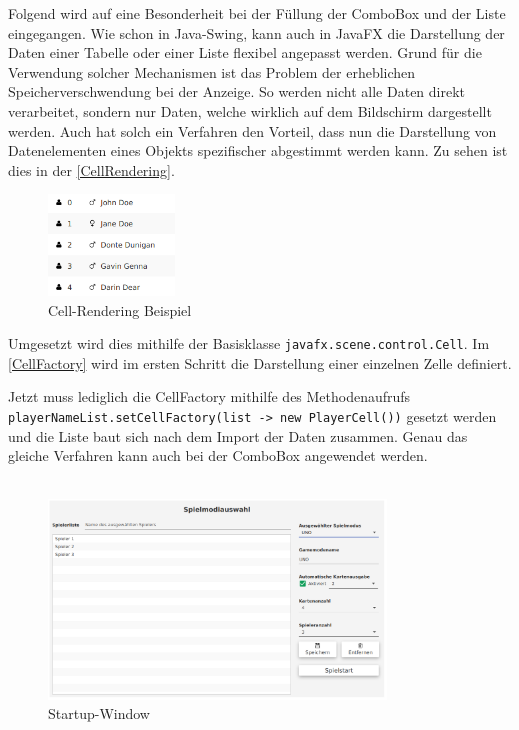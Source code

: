 Folgend wird auf eine Besonderheit bei der Füllung der ComboBox und der Liste eingegangen.
Wie schon in Java-Swing, kann auch in JavaFX die Darstellung der Daten einer Tabelle oder einer Liste flexibel angepasst werden.
Grund für die Verwendung solcher Mechanismen ist das Problem der erheblichen Speicherverschwendung bei der Anzeige.
So werden nicht alle Daten direkt verarbeitet, sondern nur Daten, welche wirklich auf dem Bildschirm dargestellt werden.
Auch hat solch ein Verfahren den Vorteil, dass nun die Darstellung von Datenelementen eines Objekts spezifischer abgestimmt werden kann.
Zu sehen ist dies in der \autoref{CellRendering}.
\begin{figure}[H]
\centering
\includegraphics[width=0.3\textwidth]{fig/ainf/CellRendering}
\caption{Cell-Rendering Beispiel}
\label{CellRendering}
\end{figure}
Umgesetzt wird dies mithilfe der Basisklasse \lstinline[style=java]{javafx.scene.control.Cell}.
Im \autoref{CellFactory} wird im ersten Schritt die Darstellung einer einzelnen Zelle definiert.

Jetzt muss lediglich die CellFactory mithilfe des Methodenaufrufs \lstinline[style=java]{playerNameList.setCellFactory(list -> new PlayerCell())} gesetzt werden und die Liste baut sich nach dem Import der Daten zusammen.
Genau das gleiche Verfahren kann auch bei der ComboBox angewendet werden.\\\\
\begin{figure}[H]
\centering
\vspace{-10mm}
\includegraphics[width=0.8\textwidth]{fig/ainf/Startup_German.png}
\caption{Startup-Window}
\label{startupWindow}
\end{figure}
